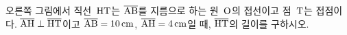 \noindent\begin{minipage}[t]{0.58\linewidth}\vspace{0pt}\raggedright 오른쪽 그림에서 직선~$\mathrm{HT}$는 $\overline{\mathrm{AB}}$를 지름으로 하는 원~$\mathrm{O}$의 접선이고 점~$\mathrm{T}$는 접점이다. $\overline{\mathrm{AH}}\perp\overline{\mathrm{HT}}$이고 $\overline{\mathrm{AB}}=10\,\mathrm{cm}$, $\overline{\mathrm{AH}}=4\,\mathrm{cm}$일 때, $\overline{\mathrm{HT}}$의 길이를 구하시오.\end{minipage}\hfill\begin{minipage}[t]{0.4\linewidth}\vspace{0pt}\centering \resizebox{\ifdim\width>\linewidth\linewidth\else\width\fi}{!}{}\end{minipage}\par
